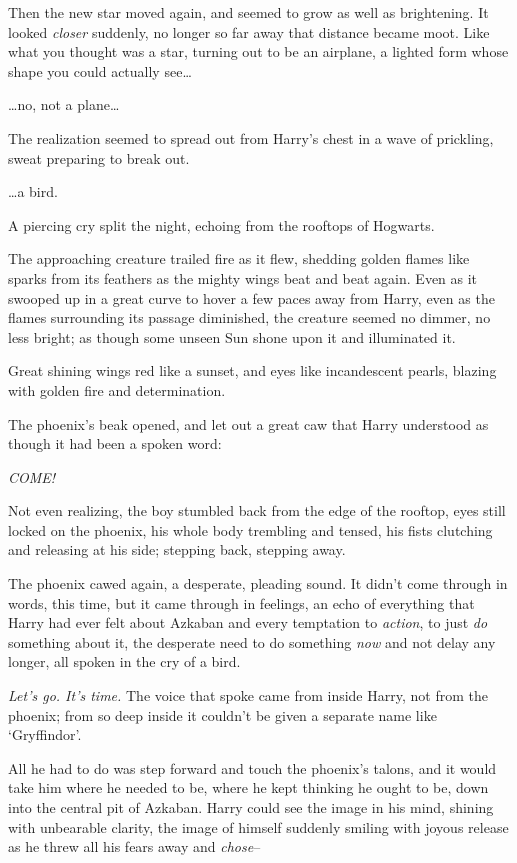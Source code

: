 Then the new star moved again, and seemed to grow as well as brightening. It looked \emph{closer} suddenly, no longer so far away that distance became moot. Like what you thought was a star, turning out to be an airplane, a lighted form whose shape you could actually see{\ldots}

{\ldots}no, not a plane{\ldots}

The realization seemed to spread out from Harry's chest in a wave of prickling, sweat preparing to break out.

{\ldots}a bird.

A piercing cry split the night, echoing from the rooftops of Hogwarts.

The approaching creature trailed fire as it flew, shedding golden flames like sparks from its feathers as the mighty wings beat and beat again. Even as it swooped up in a great curve to hover a few paces away from Harry, even as the flames surrounding its passage diminished, the creature seemed no dimmer, no less bright; as though some unseen Sun shone upon it and illuminated it.

Great shining wings red like a sunset, and eyes like incandescent pearls, blazing with golden fire and determination.

The phoenix's beak opened, and let out a great caw that Harry understood as though it had been a spoken word:

\emph{COME!}

Not even realizing, the boy stumbled back from the edge of the rooftop, eyes still locked on the phoenix, his whole body trembling and tensed, his fists clutching and releasing at his side; stepping back, stepping away.

The phoenix cawed again, a desperate, pleading sound. It didn't come through in words, this time, but it came through in feelings, an echo of everything that Harry had ever felt about Azkaban and every temptation to \emph{action}, to just \emph{do} something about it, the desperate need to do something \emph{now} and not delay any longer, all spoken in the cry of a bird.

\emph{Let's go. It's time.} The voice that spoke came from inside Harry, not from the phoenix; from so deep inside it couldn't be given a separate name like `Gryffindor'.

All he had to do was step forward and touch the phoenix's talons, and it would take him where he needed to be, where he kept thinking he ought to be, down into the central pit of Azkaban. Harry could see the image in his mind, shining with unbearable clarity, the image of himself suddenly smiling with joyous release as he threw all his fears away and \emph{chose}\---

